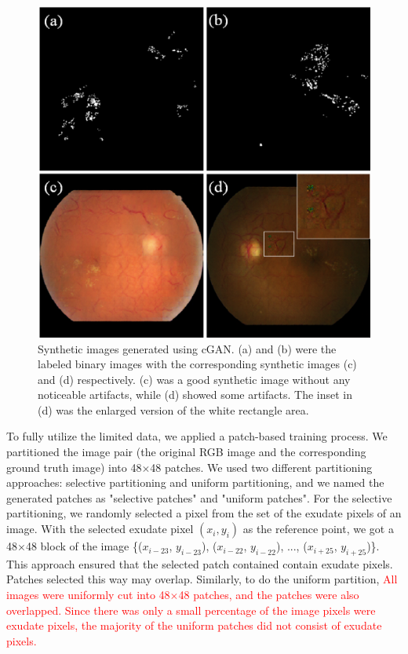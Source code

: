 \documentclass{osa-article}
\begin{document}
\begin{figure}[ht]
\centering
\includegraphics[scale=0.6]{GAN_img.eps}
\caption{Synthetic images generated using cGAN. (a) and (b) were the labeled binary images with the corresponding synthetic images (c) and (d) respectively.  (c) was a good synthetic image without any noticeable artifacts, while (d) showed some artifacts. The inset in (d) was the enlarged version of the white rectangle area.  }
\label{fig:GAN-generated}
\end{figure}


To fully utilize the limited data, we applied a patch-based training process. We partitioned the image pair (the original RGB image and the corresponding ground truth image) into 48$\times$48 patches. 
We used two different partitioning approaches: selective partitioning and uniform partitioning, and we named the generated patches as "selective patches" and "uniform patches". For the selective partitioning, we randomly selected a pixel from the set of the exudate pixels of an image. With the selected exudate pixel $(x_i, y_i)$ as the reference point, we got a 48$\times$48 block of the image {\{($x_{i-23}$, $y_{i-23}$), ($x_{i-22}$, $y_{i-22}$), ..., ($x_{i+25}$, $y_{i+25}$)\}}. This approach ensured that the selected patch contained contain exudate pixels. Patches selected this way may overlap. Similarly, to do the uniform partition, \textcolor{red}{All images were uniformly cut into 48$\times$48 patches, and the patches were also overlapped. Since there was only a small percentage of the image pixels were exudate pixels, the majority of the uniform patches did not consist of exudate pixels.} 
\end{document}
